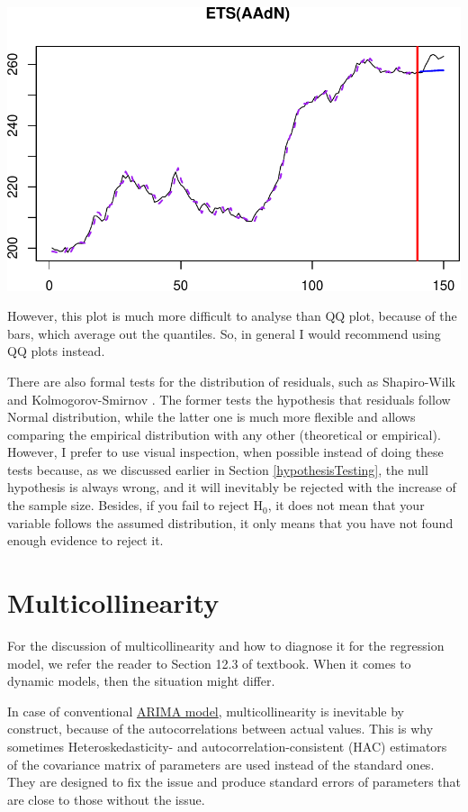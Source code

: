 \documentclass[
]{book}
\theoremstyle{definition}
\theoremstyle{definition}
\theoremstyle{definition}
\theoremstyle{definition}
\theoremstyle{remark}
\begin{document}
\includegraphics{adam_files/figure-latex/unnamed-chunk-171-1.pdf}

However, this plot is much more difficult to analyse than QQ plot, because of the bars, which average out the quantiles. So, in general I would recommend using QQ plots instead.

There are also formal tests for the distribution of residuals, such as Shapiro-Wilk \citep{WikipediaShapiroWilk2021} and Kolmogorov-Smirnov \citep{WikipediaKolmogorovSmirnov2021}. The former tests the hypothesis that residuals follow Normal distribution, while the latter one is much more flexible and allows comparing the empirical distribution with any other (theoretical or empirical). However, I prefer to use visual inspection, when possible instead of doing these tests because, as we discussed earlier in Section \ref{hypothesisTesting}, the null hypothesis is always wrong, and it will inevitably be rejected with the increase of the sample size. Besides, if you fail to reject H\(_0\), it does not mean that your variable follows the assumed distribution, it only means that you have not found enough evidence to reject it.

\hypertarget{diagnosticsMulticollinearity}{%
\section{Multicollinearity}\label{diagnosticsMulticollinearity}}

For the discussion of multicollinearity and how to diagnose it for the regression model, we refer the reader to Section 12.3 of \citet{SvetunkovSBA} textbook. When it comes to dynamic models, then the situation might differ.

In case of conventional \protect\hyperlink{ARIMA}{ARIMA model}, multicollinearity is inevitable by construct, because of the autocorrelations between actual values. This is why sometimes Heteroskedasticity- and autocorrelation-consistent (HAC) estimators of the covariance matrix \citep[see Section 15.4 of][]{Hanck2020} of parameters are used instead of the standard ones. They are designed to fix the issue and produce standard errors of parameters that are close to those without the issue.
\end{document}
